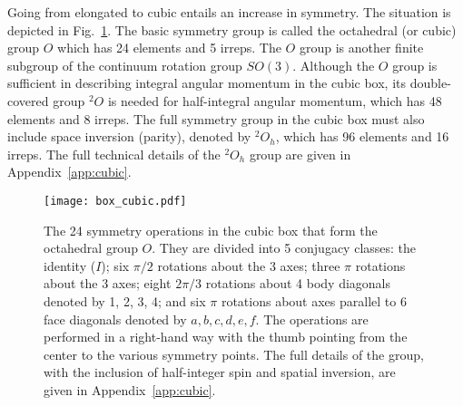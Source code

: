 \documentclass[aps,prd,reprint,showpacs,floatfix,longbibliography,,superscriptaddress]{revtex4-1}
\begin{document}
\begin{widetext}
Going from elongated to cubic entails an increase in symmetry. 
The situation is depicted in Fig.~\ref{fig:box_cubic}.
The basic symmetry group is called the octahedral (or cubic) group $O$ which has 24 elements and 5 irreps.
The $O$ group is another finite subgroup of the continuum rotation group $SO(3)$.
Although the $O$ group is sufficient in describing integral angular momentum in the cubic box, 
its double-covered group $^2O$ is needed for half-integral angular momentum, which has 48 elements and 8 irreps. 
The full symmetry group in the cubic box must also include space inversion (parity), 
denoted by $^2O_{h}$, which has 96 elements and 16 irreps.  
The full technical details of the $^2O_{h}$ group are given in Appendix~\ref{app:cubic}.
%
\begin{figure}
\texttt{[image: box\_cubic.pdf]}
\vspace{-2.5cm}
\caption{The 24 symmetry operations in the cubic box that form the octahedral group $O$.
They are divided into 5 conjugacy classes: 
the identity ($I$);  six $\pi/2$ rotations about the 3 axes; 
three $\pi$ rotations about the 3 axes;  
eight $2\pi/3$ rotations about 4 body diagonals denoted by 1, 2, 3, 4; 
and six $\pi$ rotations about axes  parallel to 6 face diagonals denoted by $a, b, c, d, e, f$. 
The operations are performed in a right-hand way with the thumb pointing from the center to the various symmetry points. 
The full details of the group, with the inclusion of half-integer spin and spatial inversion, 
are given in Appendix~\ref{app:cubic}.}
\label{fig:box_cubic}
\end{figure}



\end{widetext}
\end{document}
